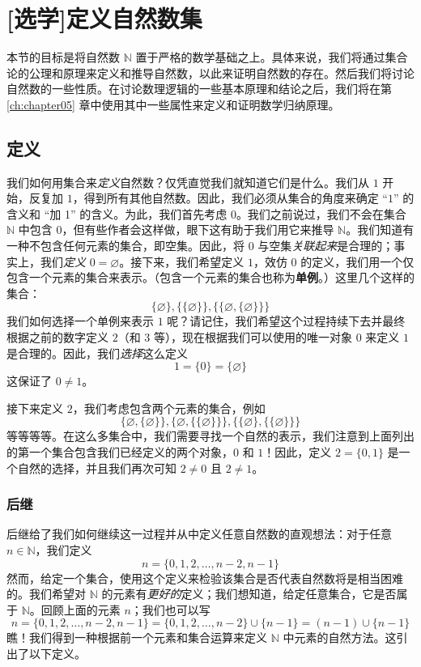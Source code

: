 \section[定义自然数集]{[选学]定义自然数集}

本节的目标是将自然数 $\mathbb{N}$ 置于严格的数学基础之上。具体来说，我们将通过集合论的公理和原理来定义和推导自然数，以此来证明自然数的存在。然后我们将讨论自然数的一些性质。在讨论数理逻辑的一些基本原理和结论之后，我们将在第 \ref{ch:chapter05} 章中使用其中一些属性来定义和证明数学归纳原理。

\subsection{定义}

我们如何用集合来\emph{定义}自然数？仅凭直觉我们就知道它们是什么。我们从 $1$ 开始，反复加 $1$，得到所有其他自然数。因此，我们必须从集合的角度来确定 ``$1$'' 的含义和 ``加 1'' 的含义。为此，我们首先考虑 $0$。我们之前说过，我们不会在集合 $\mathbb{N}$ 中包含 $0$，但有些作者会这样做，眼下这有助于我们用它来推导 $\mathbb{N}$。我们知道有一种不包含任何元素的集合，即空集。因此，将 $0$ 与空集\emph{关联起来}是合理的；事实上，我们\emph{定义} $0 = \varnothing$。接下来，我们希望定义 $1$，效仿 $0$ 的定义，我们用一个仅包含一个元素的集合来表示。（包含一个元素的集合也称为\textbf{单例}。）这里几个这样的集合：
\[\{\varnothing\}, \{\{\varnothing\}\} , \{\{\varnothing, \{\varnothing\}\}\}\]
我们如何选择一个单例来表示 $1$ 呢？请记住，我们希望这个过程持续下去并最终根据之前的数字定义 $2$（和 $3$ 等），现在根据我们可以使用的唯一对象 $0$ 来定义 $1$ 是合理的。因此，我们\emph{选择}这么定义
\[1 = \{0\} = \{\varnothing\}\]
这保证了 $0 \ne 1$。

接下来定义 $2$，我们考虑包含两个元素的集合，例如
\[\{\varnothing, \{\varnothing\}\}, \{\varnothing, \{\{\varnothing\}\}\}, \{\{\varnothing\}, \{\{\varnothing\}\}\}\]
等等等等。在这么多集合中，我们需要寻找一个自然的表示，我们注意到上面列出的第一个集合包含我们已经定义的两个对象，$0$ 和 $1$！因此，定义 $2 = \{0, 1\}$ 是一个自然的选择，并且我们再次可知 $2 \ne 0$ 且 $2 \ne 1$。

\subsubsection*{后继}

后继给了我们如何继续这一过程并从中定义任意自然数的直观想法：对于任意 $n \in \mathbb{N}$，我们定义
\[n = \{0, 1, 2, \dots , n - 2, n - 1\}\]
然而，给定一个集合，使用这个定义来检验该集合是否代表自然数将是相当困难的。我们希望对 $\mathbb{N}$ 的元素有\emph{更好的}定义；我们想知道，给定任意集合，它是否属于 $\mathbb{N}$。回顾上面的元素 $n$；我们也可以写
\[n = \{0, 1, 2, \dots , n - 2, n - 1\} = \{0, 1, 2, \dots , n - 2\} \cup \{n-1\} = (n-1) \cup \{n-1\}\]
瞧！我们得到一种根据前一个元素和集合运算来定义 $\mathbb{N}$ 中元素的自然方法。这引出了以下定义。

